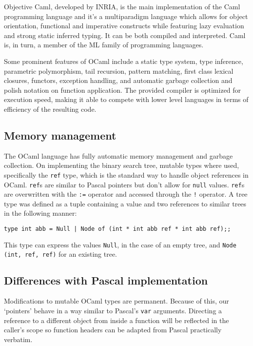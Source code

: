\documentclass[11pt]{scrartcl} %
\begin{document}
Objective Caml, developed by INRIA, is the main implementation of the Caml programming language and it's a multiparadigm language which allows for object orientation, functional and imperative constructs while featuring lazy evaluation and strong static inferred typing. It can be both compiled and interpreted. Caml is, in turn, a member of the ML family of programming languages.

Some prominent features of OCaml include a static type system, type inference, parametric polymorphism, tail recursion, pattern matching, first class lexical closures, functors, exception handling, and automatic garbage collection and polish notation on function application. The provided compiler is optimized for execution speed, making it able to compete with lower level languages in terms of efficiency of the resulting code.

\subsection*{Memory management}

The OCaml language has fully automatic memory management and garbage collection. On implementing the binary search tree, mutable types where used, specifically the \texttt{ref} type, which is the standard way to handle object references in OCaml. \texttt{ref}s are similar to Pascal pointers but don't allow for \texttt{null} values. \texttt{ref}s are overwritten with the \texttt{:=} operator and accessed through the \texttt{!} operator. A tree type was defined as a tuple containing a value and two references to similar trees in the following manner:

\texttt{type int abb = Null | Node of (int * int abb ref * int abb ref);;} 

This type can express the values \texttt{Null}, in the case of an empty tree, and \texttt{Node (int, ref, ref)} for an existing tree.

\subsection*{Differences with Pascal implementation}

Modifications to mutable OCaml types are permanent. Because of this, our `pointers' behave in a way similar to Pascal's \texttt{var} arguments. Directing a reference to a different object from inside a function will be reflected in the caller's scope so function headers can be adapted from Pascal practically verbatim.
\end{document}
